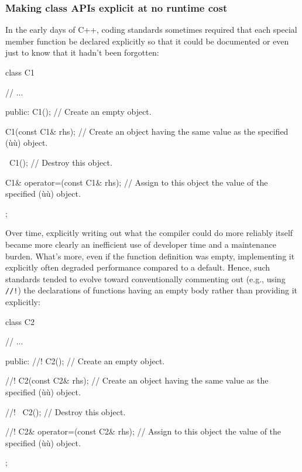 \subsubsection[Making class APIs explicit at no runtime cost]{Making class APIs explicit at no runtime cost}\label{making-class-apis-explicit-at-no-runtime-cost}

In the early days of C++, coding standards sometimes
required that each special member function be declared explicitly so
that it could be documented or even just to know that it hadn't been
forgotten:

\begin{emcppslisting}[language=C++]
class C1
{
     // ...

public:
   C1();
       // Create an empty object.

   C1(const C1& rhs);
       // Create an object having the same value as the specified (ù{}ù) object.

   ~C1();
       // Destroy this object.

   C1& operator=(const C1& rhs);
       // Assign to this object the value of the specified (ù{}ù) object.
};
\end{emcppslisting}
    
\noindent Over time, explicitly writing out what the compiler
could do more reliably itself became more clearly an inefficient use of developer time and a maintenance burden.
What's more, even if the function definition was empty, implementing it
explicitly often degraded performance compared to a  default. Hence, such
standards tended to evolve toward conventionally commenting out (e.g.,
using \lstinline|//!|) 
the declarations of functions having an empty
body rather than providing it explicitly:

\begin{emcppslisting}[language=C++]
class C2
{
     // ...

public:
   //! C2();
       // Create an empty object.

   //! C2(const C2& rhs);
       // Create an object having the same value as the specified (ù{}ù) object.

   //! ~C2();
       // Destroy this object.

   //! C2& operator=(const C2& rhs);
       // Assign to this object the value of the specified (ù{}ù) object.
};
\end{emcppslisting}
    
